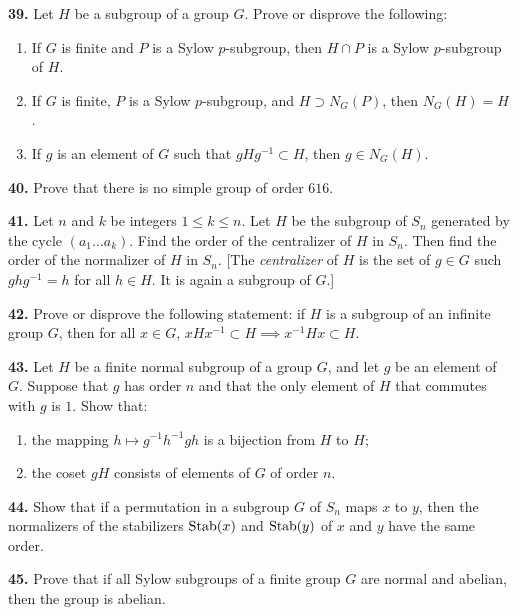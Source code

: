 \documentclass[a4paper,11pt,final,openany]{memoir}%
\theoremstyle{nonumberplain}
\begin{document}
\medskip\noindent\textbf{39.} Let $H$ be a subgroup of a group $G$. Prove or
disprove the following:

\begin{enumerate}
\item If $G$ is finite and $P$ is a Sylow $p$-subgroup, then $H\cap P$ is a
Sylow $p$-subgroup of $H$.

\item If $G$ is finite, $P$ is a Sylow $p$-subgroup, and $H\supset N_{G}(P)$,
then $N_{G}(H)=H$.

\item If $g$ is an element of $G$ such that $gHg^{-1}\subset H$, then $g\in
N_{G}(H)$.
\end{enumerate}

\medskip\noindent\textbf{40.} Prove that there is no simple group of order
$616$.

\medskip\noindent\textbf{41.} Let $n$ and $k$ be integers $1\leq k\leq n$. Let
$H$ be the subgroup of $S_{n}$ generated by the cycle $(a_{1}\ldots a_{k})$.
Find the order of the centralizer of $H$ in $S_{n}$. Then find the order of
the normalizer of $H$ in $S_{n}$. [The \emph{centralizer}%
%
\emph{ }of $H$ is the set of $g\in G$ such $ghg^{-1}=h$ for all $h\in H$. It
is again a subgroup of $G$.]

\medskip\noindent\textbf{42.} Prove or disprove the following statement: if
$H$ is a subgroup of an infinite group $G$, then for all $x\in G$,
$xHx^{-1}\subset H\implies x^{-1}Hx\subset H$.

\medskip\noindent\textbf{43.} Let $H$ be a finite normal subgroup of a group
$G$, and let $g$ be an element of $G$. Suppose that $g$ has order $n$ and that
the only element of $H$ that commutes with $g$ is $1$. Show that:

\begin{enumerate}
\item the mapping $h\mapsto g^{-1}h^{-1}gh$ is a bijection from $H$ to $H$;

\item the coset $gH$ consists of elements of $G$ of order $n$.
\end{enumerate}

\medskip\noindent\textbf{44.} Show that if a permutation in a subgroup $G$ of
$S_{n}$ maps $x$ to $y$, then the normalizers of the stabilizers $\operatorname{Stab}(x) $
and $\operatorname{Stab}(y)$ of $x$ and $y$ have the same order.

\medskip\noindent\textbf{45.} Prove that if all Sylow subgroups of a finite
group $G$ are normal and abelian, then the group is abelian.
\end{document}
